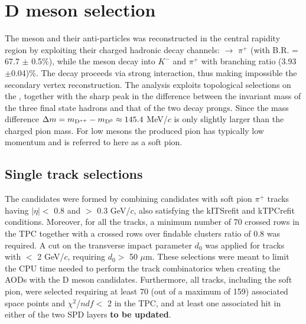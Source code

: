 \section{D meson selection}
The \Dstar meson and their anti-particles was reconstructed in the central rapidity region by exploiting their charged hadronic decay channels: \Dstar $\rightarrow$ \Dzero$\pi^{+}$ (with B.R. = 67.7 $\pm$ 0.5$\%$), while the \Dzero meson decay into $K^-$ and $\pi^{+}$ with branching ratio (3.93$\pm$0.04)\%. The \Dstar decay proceeds via strong interaction, thus making impossible the secondary vertex reconstruction. The analysis exploits topological selections on the \Dzero,  together with the sharp peak in the difference between the invariant mass of the three final state hadrons and that of the two \Dzero decay prongs. Since the mass difference $\Delta m = m_{\rm D^{\ast +}} - m_{\rm D^0} \approx 145.4$ MeV/$c$ is only slightly larger than the charged pion mass. For low \pt \Dstar mesons the produced pion has typically low momentum and is referred to here as a soft pion.



\subsection{Single track selections}
\label{sec:single_track}

The \Dstar candidates were formed by combining \Dzero candidates with soft pion $\pi^{+}$ tracks having $|\eta| <$ 0.8 and \pt $>$ 0.3 GeV/$c$, also satisfying the kITSrefit and kTPCrefit conditions. Moreover, for all the tracks, a minimum number of 70 crossed rows in the TPC together with a crossed rows over findable clusters ratio of 0.8 was required. A cut on the transverse impact parameter $d_0$ was applied for tracks with \pt $<$ 2 GeV/$c$, requiring $d_0 >$ 50 $\mu$m. These selections were meant to limit the CPU time needed to perform the track combinatorics when creating the AODs with the D meson candidates. Furthermore, all tracks, including the \Dstar soft pion, were selected requiring at least 70 (out of a maximum of 159) associated space points and $\chi^2$/$ndf <$ 2 in the TPC, and at least one associated hit in either of the two SPD layers \textbf{to be updated}.
  
